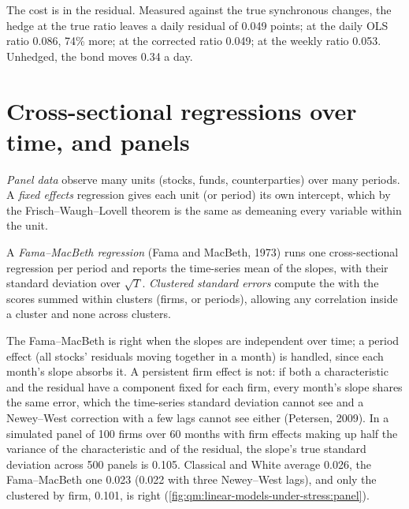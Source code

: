 The cost is in the residual. Measured against the true synchronous changes, the hedge at the true ratio leaves a daily residual of 0.049
points; at the daily OLS ratio 0.086, 74\% more; at the corrected ratio 0.049; at the weekly ratio 0.053. Unhedged, the bond moves 0.34 a day.

\section{Cross-sectional regressions over time, and panels}

\begin{definition}\label{def:qm:linear-models-under-stress:panel}
\emph{Panel data} observe many units (stocks, funds, counterparties) over many periods. A \emph{fixed effects}
regression gives each unit (or period) its own intercept, which by the Frisch--Waugh--Lovell theorem is the same as demeaning every variable
within the unit.
\end{definition}

\begin{definition}\label{def:qm:linear-models-under-stress:fm}
A \emph{Fama--MacBeth regression} (Fama and MacBeth, 1973) runs one cross-sectional regression per period and
reports the time-series mean of the slopes, with  their standard deviation over $\sqrt T$. \emph{Clustered standard
errors} compute the  with the scores summed within clusters (firms, or periods), allowing any
correlation inside a cluster and none across clusters.
\end{definition}

The Fama--MacBeth  is right when the slopes are independent over time; a period effect (all stocks' residuals moving together in
a month) is handled, since each month's slope absorbs it. A persistent firm effect is not: if both a characteristic and the residual have a
component fixed for each firm, every month's slope shares the same error, which the time-series standard deviation cannot see and a Newey--West
correction with a few lags cannot see either (Petersen, 2009). In a simulated panel of 100 firms over 60 months with firm effects making up half
the variance of the characteristic and of the residual, the slope's true standard deviation across 500 panels is 0.105. Classical and White
 average 0.026, the Fama--MacBeth one 0.023 (0.022 with three Newey--West lags), and only the  clustered by firm, 0.101,
is right (\cref{fig:qm:linear-models-under-stress:panel}).

